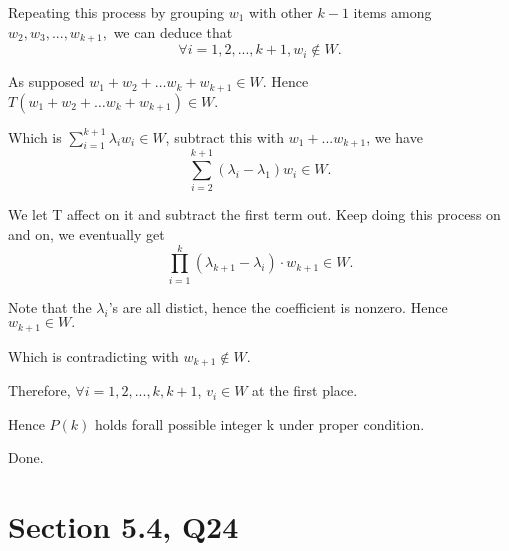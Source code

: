 \documentclass[12pt]{article}%
\begin{document}
Repeating this process by grouping $w_1$ with other $k-1$ items among $w_2,w_3,...,w_{k+1},$ we can deduce that $$\forall i=1,2,...,k+1, w_{i} \notin W.$$

As supposed $w_1+w_2+\dots w_k + w_{k+1} \in W.$ Hence $T(w_1+w_2+\dots w_k + w_{k+1} )\in W.$ 

Which is $\sum_{i=1}^{k+1}\lambda_{i}w_i \in W$, subtract this with $w_1+...w_{k+1}$, we have $$\sum_{i=2}^{k+1}(\lambda_{i}-\lambda_1)w_{i} \in W.$$

We let T affect on it and subtract the first term out. Keep doing this process on and on, we eventually get $$\prod_{i=1}^{k}(\lambda_{k+1}-\lambda_i) \cdot w_{k+1} \in W.$$

Note that the $\lambda_i$'s are all distict, hence the coefficient is nonzero. Hence $w_{k+1} \in W.$

Which is contradicting with $w_{k+1} \notin W.$

Therefore, $\forall i=1,2,...,k,k+1$, $v_i \in W$ at the first place.

Hence $P(k)$ holds forall possible integer k under proper condition.

Done.


\section{Section 5.4, Q24}
\end{document}
